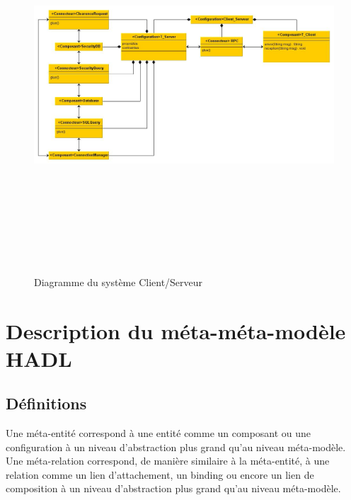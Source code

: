 \documentclass[11pt,a4paper]{article}
\begin{document}
\begin{figure}[h]
  		\centering
  		\includegraphics[height=14cm,width=15cm,angle=90]{M1.jpg}
  		\caption{Diagramme du système Client/Serveur}
  		\label{Diagramme du système Client/Serveur}
\end{figure}

\clearpage


\section{Description du méta-méta-modèle HADL}
\subsection{Définitions}
Une méta-entité correspond à une entité comme un composant ou une
configuration à un niveau d'abstraction plus grand qu'au niveau méta-modèle.\\

Une méta-relation correspond, de manière similaire à la méta-entité, à une
relation comme un lien d'attachement, un binding ou encore un lien de
composition à un niveau d'abstraction plus grand qu'au niveau méta-modèle.\\
\end{document}
